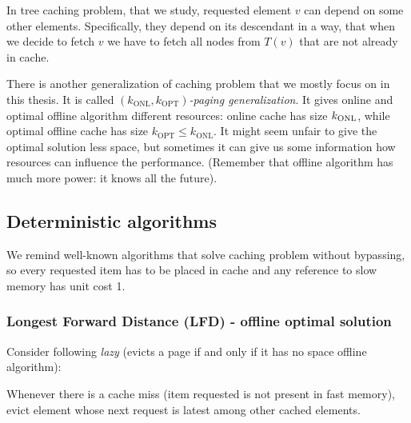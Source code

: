 In tree caching problem, that we study, requested element $v$ can depend 
on some other elements. Specifically, they depend on its descendant in a 
way, that when we decide to fetch $v$ we have to fetch all nodes from $T(v)$ 
that are not already in cache.

There is another generalization of caching problem that we mostly focus on in 
this thesis. It is called 
$(k_{\mathrm{ONL}}, k_{\mathrm{OPT}})$\textit{-paging generalization}. It gives 
online and optimal offline algorithm different resources: online cache has size 
$k_{\mathrm{ONL}}$, while optimal offline cache has size 
$k_{\mathrm{OPT}} \leq k_{\mathrm{ONL}}$. It might seem 
unfair to give the optimal solution less space, but sometimes it can give us 
some information how resources can influence the performance. (Remember 
that offline algorithm has much more power: it knows all the future).

\subsection{Deterministic algorithms}
We remind well-known algorithms that solve caching problem without bypassing, 
so every requested item has to be placed in cache and any reference to 
slow memory has unit cost 1.
\subsubsection{Longest Forward Distance (LFD) - offline optimal solution}
Consider following \textit{lazy} (evicts a page if and only if it has no space  
offline algorithm): 
\begin{myalgo}
Whenever there is a cache miss (item requested is not 
present in fast memory), evict element whose next request is latest among other 
cached elements.
\end{myalgo}

